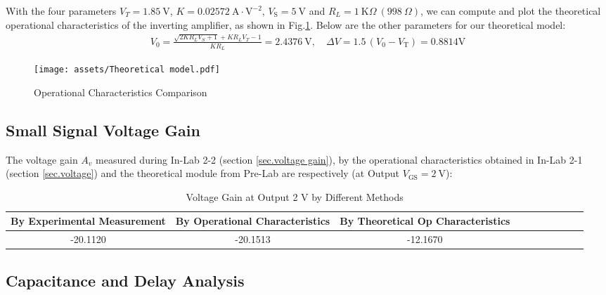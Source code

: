 \documentclass[UTF8]{report}
\def\KO{\ \mathrm{K}\Omega}
\theoremstyle{MyLineTheoremStyle} %
\theoremstyle{MyBlockTheoremStyle} %
\theoremstyle{MySubsubsectionStyle} %
\begin{document}
With the four parameters $V_T = 1.85 \ \mathrm{V}$, $K = 0.02572 \ \mathrm{A\cdot V^{-2}}$, $V_\text{S} = 5 \ \mathrm{V}$ and $R_L = 1 \KO\ (998 \ \Omega)$, we can compute and plot the theoretical operational characteristics of the inverting amplifier, as shown in Fig.\ref{Operational Characteristics Comparison}. Below are the other parameters for our theoretical model:
\begin{gather}
V_0 = \frac{\sqrt{ 2KR_LV_S + 1 } + KR_L V_T - 1}{K R_L} = 2.4376 \ \mathrm{V},\quad \Delta V = 1.5\, (V_0 - V_\text{T}) = 0.8814 \mathrm{V}
\end{gather}
\begin{figure}[H]\centering
    \texttt{[image: assets/Theoretical model.pdf]}
    \caption{Operational Characteristics Comparison}
    \label{Operational Characteristics Comparison}
\end{figure}


\subsection{Small Signal Voltage Gain}
The voltage gain $A_v$ measured during In-Lab 2-2 (section \ref{sec.voltage gain}), by the operational characteristics obtained in In-Lab 2-1 (section \ref{sec.voltage}) and the theoretical module from Pre-Lab are respectively (at Output $V_\text{GS} = 2 \ \mathrm{V}$):
\begin{table}[H]\centering
    \caption{Voltage Gain at Output 2 V by Different Methods}
    \label{Voltage Gain by Different Methods}
\begin{tabular}{cccccccccc}\toprule
    By Experimental Measurement & By Operational Characteristics & By Theoretical Op Characteristics \\
    \midrule
    -20.1120 & -20.1513 & -12.1670  \\
    \bottomrule
\end{tabular}
\end{table}

\subsection{Capacitance and Delay Analysis}
\end{document}
